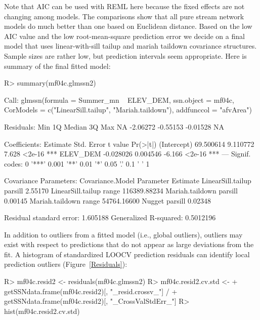 \documentclass[nojss]{jss}
\renewenvironment{Schunk}{\vspace{\topsep}}{\vspace{\topsep}}
\begin{document}
Note that AIC can be used with REML here because the fixed effects are
not changing among models. The comparisons show that all pure stream
network models do much better than one based on Euclidean
distance. Based on the low AIC value and the low root-mean-square
prediction error we decide on a final model that uses linear-with-sill tailup
and mariah taildown covariance structures.  Sample sizes are rather low, but
prediction intervals seem appropriate.  Here is summary of the final
fitted model:

\begin{Schunk}
\begin{Sinput}
R> summary(mf04c.glmssn2)
\end{Sinput}
\begin{Soutput}
Call:
glmssn(formula = Summer_mn ~ ELEV_DEM, ssn.object = mf04c, CorModels = c("LinearSill.tailup", 
    "Mariah.taildown"), addfunccol = "afvArea")

Residuals:
     Min       1Q   Median       3Q      Max 
      NA -2.06272 -0.55153 -0.01528       NA 

Coefficients:
             Estimate Std. Error t value Pr(>|t|)    
(Intercept) 69.500614   9.110772   7.628   <2e-16 ***
ELEV_DEM    -0.028026   0.004546  -6.166   <2e-16 ***
---
Signif. codes:  0 '***' 0.001 '**' 0.01 '*' 0.05 '.' 0.1 ' ' 1

Covariance Parameters:
  Covariance.Model Parameter     Estimate
 LinearSill.tailup   parsill      2.55170
 LinearSill.tailup     range 116389.88234
   Mariah.taildown   parsill      0.00145
   Mariah.taildown     range  54764.16600
            Nugget   parsill      0.02348

Residual standard error: 1.605188
Generalized R-squared: 0.5012196
\end{Soutput}
\end{Schunk}

In addition to outliers from a fitted model (i.e., global outliers),
outliers may exist with respect to predictions that do not appear as
large deviations from the fit.  A histogram of standardized LOOCV
prediction residuals can identify local prediction outliers
(Figure~\ref{Residuals}):

\begin{Schunk}
\begin{Sinput}
R> mf04c.resid2 <- residuals(mf04c.glmssn2)
R> mf04c.resid2.cv.std <-
+      getSSNdata.frame(mf04c.resid2)[, "_resid.crossv_"] /
+      getSSNdata.frame(mf04c.resid2)[, "_CrossValStdErr_"]
R> hist(mf04c.resid2.cv.std)
\end{Sinput}
\end{Schunk}
\end{document}
